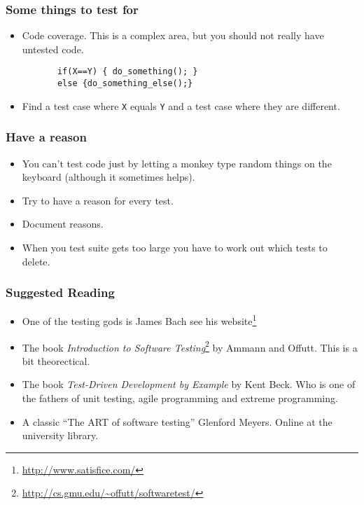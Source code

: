 \documentclass{beamer}
\begin{document}
\begin{frame}[fragile]
  \frametitle{Some things to test for}
  \begin{itemize}
  \item Code coverage. This is a complex area, but you should not
    really have untested code.
    \begin{lstlisting}
       if(X==Y) { do_something(); } 
       else {do_something_else();}
    \end{lstlisting}
\item Find a test case where {\tt X} equals {\tt Y} and a test case
  where they are different.
  \end{itemize}
\end{frame}
\begin{frame}
  \frametitle{Have a reason}
  \begin{itemize}
  \item You can't test code just by letting a monkey type random
    things on the keyboard (although it sometimes helps).
  \item Try to have a reason for every test.
  \item Document reasons.
  \item When you test suite gets too large you have to work out which
    tests to delete.
  \end{itemize}
\end{frame}
\begin{frame}
  \frametitle{Suggested Reading}
  \begin{itemize}
  \item One of the testing gods is James Bach see his
    website\footnote{\url{http://www.satisfice.com/}}
  \item The book {\em Introduction to Software
      Testing}\footnote{\url{http://cs.gmu.edu/~offutt/softwaretest/}}
    by Ammann and Offutt. This is a bit theorectical. 
  \item The book {\em Test-Driven Development by Example} by Kent Beck.
    Who is one of the  fathers of unit testing, agile programming  and
    extreme programming. 
    \item A classic ``The ART of software testing'' Glenford Meyers.  Online
      at the university library. 
  \end{itemize}
\end{frame}
\end{document}
